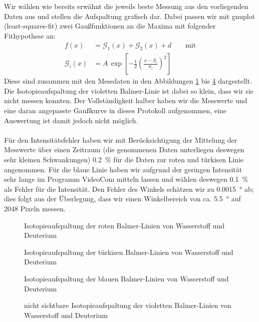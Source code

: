 \documentclass[11pt, a4paper]{article}
\numberwithin{equation}{section}
\begin{document}
Wir wählen wie bereits erwähnt die jeweils beste Messung aus den vorliegenden Daten aus und stellen die Aufspaltung grafisch dar.
Dabei passen wir mit gnuplot (least-squares-fit) zwei Gaußfunktionen an die Maxima mit folgender Fithypothese an:
\begin{align}
f(x)&=\mathcal{G}_1(x)+\mathcal{G}_2(x) + d\qquad\text{mit}\\
\mathcal{G}_i(x)&=A\,\exp\left[-\frac{1}{2}\left(\frac{x-S_i}{\sigma_i}\right)^2\right]
\end{align}
Diese sind zusammen mit den Messdaten in den Abbildungen \ref{fig:aufspaltung_rot} bis  \ref{fig:aufspaltung_violett} dargestellt.
Die Isotopieaufspaltung der violetten Balmer-Linie ist dabei so klein, dass wir sie nicht messen konnten.
Der Vollständigkeit halber haben wir die Messwerte und eine daran angepasste Gaußkurve in dieses Protokoll aufgenommen, eine Auswertung ist damit jedoch nicht möglich.\\
\\
Für den Intensitätsfehler haben wir mit Berücksichtigung der Mittelung der Messwerte über einen Zeitraum (die genommenen Daten unterliegen deswegen sehr kleinen Schwankungen) \SI{0.2}{\percent} für die Daten zur roten und türkisen Linie angenommen.
Für die blaue Linie haben wir aufgrund der geringen Intensität sehr lange im Programm VideoCom mitteln lassen und wählen deswegen \SI{0.1}{\percent} als Fehler für die Intensität.
Den Fehler des Winkels schätzen wir zu \SI{0.0015}{\degree} ab; dies folgt aus der Überlegung, dass wir einen Winkelbereich von ca. \SI{5.5}{\degree} auf \num{2048} Pixeln messen.
\begin{figure}[h]
\centering

\caption{Isotopieaufspaltung der roten Balmer-Linien von Wasserstoff und Deuterium}
\label{fig:aufspaltung_rot}
\end{figure}
\begin{figure}[h]
\centering

\caption{Isotopieaufspaltung der türkisen Balmer-Linien von Wasserstoff und Deuterium}
\label{fig:aufspaltung_tuerkis}
\end{figure}
\begin{figure}[h]
\centering

\caption{Isotopieaufspaltung der blauen Balmer-Linien von Wasserstoff und Deuterium}
\label{fig:aufspaltung_blau}
\end{figure}
\begin{figure}[h]
\centering

\caption{nicht sichtbare Isotopieaufspaltung der violetten Balmer-Linien von Wasserstoff und Deuterium}
\label{fig:aufspaltung_violett}
\end{figure}
\end{document}
